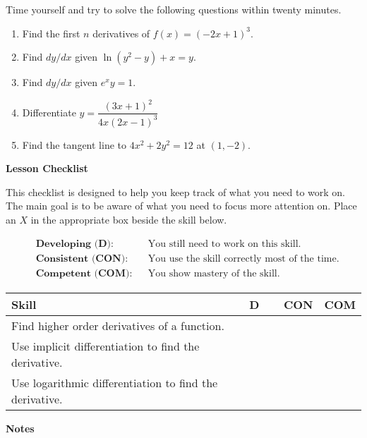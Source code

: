 \documentclass[10pt]{book}
\theoremstyle{definition}
\theoremstyle{remark}
\begin{document}
\begin{large}
\noindent
Time yourself and try to solve the following questions within twenty minutes. 
\begin{enumerate}
\item Find the first $n$ derivatives of $f(x) = (-2x+1)^3$.\vfil
\item Find $dy/dx$ given $\ln(y^2 - y) + x = y$.\vfil
\item Find $dy/dx$ given $e^xy = 1$.\vfil
\item Differentiate $y = \dfrac{(3x+1)^2}{4x(2x-1)^3}$\vfil
\item Find the tangent line to $4x^2 + 2y^2 = 12$ at $(1,-2)$.\vfil
\end{enumerate}

\noindent
\textbf{Lesson Checklist}
\bigskip

\noindent
This checklist is designed to help you keep track of what you need to work on. The main goal is to be aware of what you need to focus more attention on. Place an $X$ in the appropriate box beside the skill below. 
\bigskip

\noindent
\begin{align*}
&\textbf{Developing (D):} &&\textrm{You still need to work on this skill.}\\
&\textbf{Consistent (CON):} &&\textrm{You use the skill correctly most of the time.}\\
&\textbf{Competent (COM):} &&\textrm{You show mastery of the skill.} 
\end{align*}
\vfil

\begin{center}
\begin{tabular}{|l|l|l|l|}
\hline
\textbf{Skill} & \textbf{~~D~~} & \textbf{CON} & \textbf{COM} \\
\hline
Find higher order derivatives of a function.&&&\\
\hline
Use implicit differentiation to find the derivative.&&&\\
\hline
Use logarithmic differentiation to find the derivative.&&&\\
\hline
\end{tabular}
\end{center}
 \vfil

\noindent
\textbf{Notes}
\end{large} \vfil
\newpage

\end{document}
